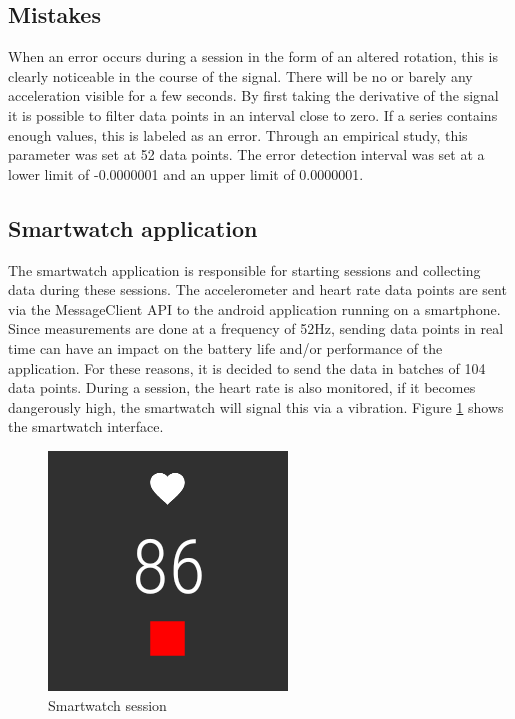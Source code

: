 \documentclass[twocolumn]{phdsymp} %
\begin{document}
\subsection{Mistakes}
When an error occurs during a session in the form of an altered rotation, this is clearly noticeable in the course of the signal. There will be no or barely any acceleration visible for a few seconds. By first taking the derivative of the signal it is possible to filter data points in an interval close to zero. If a series contains enough values, this is labeled as an error. Through an empirical study, this parameter was set at 52 data points. The error detection interval was set at a lower limit of -0.0000001 and an upper limit of 0.0000001.

\subsection{Smartwatch application}
The smartwatch application is responsible for starting sessions and collecting data during these sessions. The accelerometer and heart rate data points are sent via the MessageClient API to the android application running on a smartphone. Since measurements are done at a frequency of 52Hz, sending data points in real time can have an impact on the battery life and/or performance of the application. For these reasons, it is decided to send the data in batches of 104 data points.
During a session, the heart rate is also monitored, if it becomes dangerously high, the smartwatch will signal this via a vibration. Figure \ref{fig:smartwatch} shows the smartwatch interface.

\begin{figure}[!htpd]
\centering
  \caption{Smartwatch session} \label{fig:smartwatch}
  \includegraphics[width=.2\textwidth]{images/smartwatch-session.png}
\end{figure}
\end{document}
